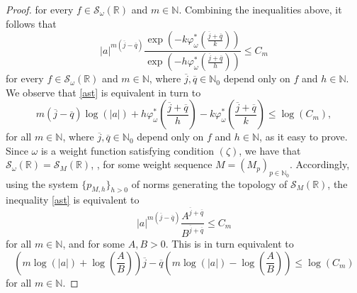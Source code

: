 \documentclass[12pt,reqno]{amsart} %
\numberwithin{equation}{section}
\begin{document}
\begin{proof}
					for every $f\in \mathcal{S}_{\omega}(\mathbb{R})$ and $m\in\mathbb{N}$. Combining the inequalities above, it follows   that
					\begin{equation}\label{ast}
						|a|^{m(\overline{j}-\overline{q})} \frac{\exp(-k\varphi^*_\omega(\frac{\overline{j}+\overline{q}}{k})) }{\exp(-h\varphi^*_\omega(\frac{\overline{j}+\overline{q}}{h})) }\leq C_m
					\end{equation} 
					for every $f\in \mathcal{S}_{\omega}(\mathbb{R})$ and $m\in\mathbb{N}$, where $\overline{j}, \overline{q}\in\mathbb{N}_0$ depend only on $f$ and $h\in\mathbb{N}$. We observe that \eqref{ast} is equivalent in turn to 
					\begin{equation*}
						m(\overline{j}-\overline{q})\log(|a|)+h\varphi^*_\omega\left(\frac{\overline{j}+\overline{q}}{h}\right)-k\varphi^*_\omega\left(\frac{\overline{j}+\overline{q}}{k}\right) \leq \log(C_m),
					\end{equation*}
					for all $m\in\mathbb{N}$, where $\overline{j}, \overline{q}\in\mathbb{N}_0$ depend only on $f$ and $h\in\mathbb{N}$, as it easy to prove. \\
					
					
					Since $\omega$ is a weight function satisfying condition $(\zeta)$, we have that $\mathcal{S}_\omega(\mathbb{R})=\mathcal{S}_M(\mathbb{R})$, \cite[Corollary 16]{BMM}, for some weight sequence $M=(M_p)_{p\in\mathbb{N}_0}$. Accordingly, using the system $\{p_{M,h}\}_{h>0}$ of norms generating the topology of  $\mathcal{S}_M(\mathbb{R})$, the inequality
					\eqref{ast} is equivalent to 
					\begin{equation*}
						|a|^{m(\overline{j}-\overline{q})} \frac{A^{\overline{j}+\overline{q}}}{B^{\overline{j}+\overline{q}}} \leq C_m 
					\end{equation*} for all $m\in\mathbb{N}$, and for some $A,B>0$.
					This is in turn equivalent to
					\begin{equation}\label{ast1}
						\left( m\log(|a|)+\log\left(\frac{A}{B}\right)\right)\overline{j}-\overline{q}\left(m\log(|a|)-\log\left(\frac{A}{B}\right)\right)\leq \log(C_m)
					\end{equation}
					for all $m\in\mathbb{N}$. 
					

\end{proof}
\end{document}
